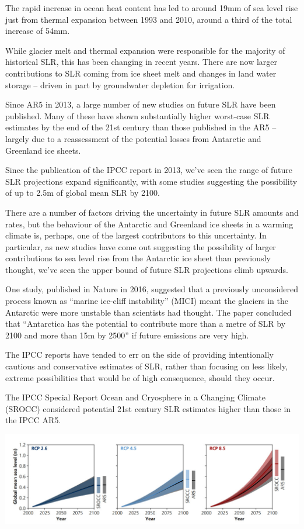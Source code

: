 \documentclass[
]{book}
\begin{document}
The rapid increase in ocean heat content has led to around 19mm of sea level rise just from thermal expansion between 1993 and 2010, around a third of the total increase of 54mm.

While glacier melt and thermal expansion were responsible for the majority of historical SLR, this has been changing in recent years. There are now larger contributions to SLR coming from ice sheet melt and changes in land water storage -- driven in part by groundwater depletion for irrigation.

Since AR5 in 2013, a large number of new studies on future SLR have been published. Many of these have shown substantially higher worst-case SLR estimates by the end of the 21st century than those published in the AR5 -- largely due to a reassessment of the potential losses from Antarctic and Greenland ice sheets.

Since the publication of the IPCC report in 2013, we've seen the range of future SLR projections expand significantly, with some studies suggesting the possibility of up to 2.5m of global mean SLR by 2100.

There are a number of factors driving the uncertainty in future SLR amounts and rates, but the behaviour of the Antarctic and Greenland ice sheets in a warming climate is, perhaps, one of the largest contributors to this uncertainty. In particular, as new studies have come out suggesting the possibility of larger contributions to sea level rise from the Antarctic ice sheet than previously thought, we've seen the upper bound of future SLR projections climb upwards.

One study, published in Nature in 2016, suggested that a previously unconsidered process known as ``marine ice-cliff instability'' (MICI) meant the glaciers in the Antarctic were more unstable than scientists had thought. The paper concluded that ``Antarctica has the potential to contribute more than a metre of SLR by 2100 and more than 15m by 2500'' if future emissions are very high.

The IPCC reports have tended to err on the side of providing intentionally cautious and conservative estimates of SLR, rather than focusing on less likely, extreme possibilities that would be of high consequence, should they occur.

The IPCC Special Report Ocean and Cryosphere in a Changing Climate (SROCC) considered potential 21st century SLR estimates higher than those in the IPCC AR5.

\includegraphics{fig/sea_level_srocc.jpg}
\end{document}
